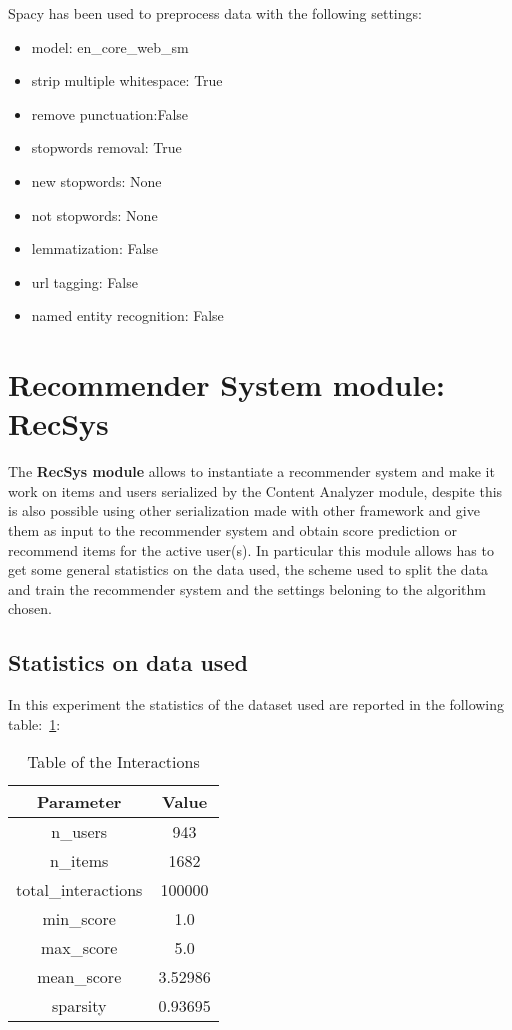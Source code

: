 \documentclass[11pt]{article}
\begin{document}
Spacy has been used to preprocess data with the following settings:
\begin{itemize}
    \item model: en\_core\_web\_sm
    \item strip multiple whitespace: True
    \item remove punctuation:False
    \item stopwords removal: True
    \item new stopwords: None
    \item not stopwords: None
    \item lemmatization: False
    \item url tagging: False
    \item named entity recognition: False
\end{itemize}
\hfill\break
\hfill\break




\section{Recommender System module: RecSys}\label{sec:recsys}
The \textbf{RecSys module} allows to instantiate a recommender system and make it work on items and users serialized
by the Content Analyzer module, despite this is also possible using other serialization made with other framework and
give them as input to the recommender system and obtain score prediction or recommend items for the active user(s).
In particular this module allows has to get some general statistics on the data used, the scheme used to split the data
and train the recommender system and the settings beloning to the algorithm chosen.
\hfill\break
\hfill\break

\subsection{Statistics on data used}\label{subsec:stats}
In this experiment the statistics of the dataset used are reported in the following table:~\ref{tab:dataset_table}:
\begin{table}[ht]
    \centering
  \begin{tabular}{|c|c|}
    \hline
    \textbf{Parameter}& \textbf{Value} \\ \hline
    n\_users  & 943\\ \hline
    n\_items  & 1682\\ \hline
    total\_interactions  & 100000\\ \hline
    min\_score  & 1.0\\ \hline
    max\_score  & 5.0\\ \hline
    mean\_score  & 3.52986\\ \hline
    sparsity  & 0.93695\\ \hline
  \end{tabular}
   \caption{Table of the Interactions}\label{tab:dataset_table}
\end{table}
\hfill\break
\hfill\break
\end{document}
